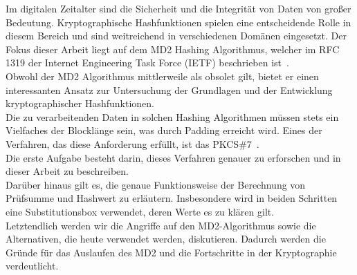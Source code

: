 Im digitalen Zeitalter sind die Sicherheit und die Integrität von Daten von großer
Bedeutung.
Kryptographische Hashfunktionen spielen eine entscheidende Rolle in
diesem Bereich und sind weitreichend in verschiedenen Domänen eingesetzt.
Der
Fokus dieser Arbeit liegt auf dem MD2 Hashing Algorithmus, welcher im RFC 1319
der Internet Engineering Task Force (IETF) beschrieben ist~\cite{rfc1319}.
\\
Obwohl der MD2 Algorithmus mittlerweile als obsolet gilt, bietet er einen
interessanten Ansatz zur Untersuchung der Grundlagen und der Entwicklung
kryptographischer Hashfunktionen.
\\
Die zu verarbeitenden Daten in solchen Hashing Algorithmen müssen stets ein
Vielfaches der Blocklänge sein, was durch Padding erreicht wird.
Eines der
Verfahren, das diese Anforderung erfüllt, ist das PKCS\#7~\cite{rfc2315}.
\\
Die erste Aufgabe besteht darin, dieses Verfahren genauer zu erforschen und in
dieser Arbeit zu beschreiben.
\\
Darüber hinaus gilt es, die genaue Funktionsweise der Berechnung von Prüfsumme
und Hashwert zu erläutern.
Insbesondere wird in beiden Schritten eine Substitutionsbox verwendet, deren
Werte es zu klären gilt.
\\
Letztendlich werden wir die Angriffe auf den MD2-Algorithmus sowie die Alternativen,
die heute verwendet werden, diskutieren.
Dadurch werden die Gründe für das Auslaufen des MD2 und die Fortschritte in der
Kryptographie verdeutlicht.